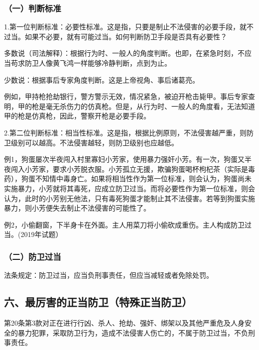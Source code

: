 \subsubsection*{（一）判断标准}

1.第一位判断标准：必要性标准。这是指，只要是制止不法侵害的必要手段，就不过当。如果不必要，就有可能过当。如何判断防卫手段是否具有必要性？

多数说（司法解释）：根据行为时、一般人的角度判断。也即，在紧急时刻，不应当苟求防卫人像黄飞鸿一样能够冷静判断，点到为止。

少数说：根据事后专家角度判断。这是上帝视角、事后诸葛亮。

例如，甲持枪抢劫银行，警方警示无效，情况紧急，被迫开枪击毙甲。事后专家查明，甲的枪是毫无杀伤力的仿真枪。但是，从行为时、一般人的角度看，无法知道甲的枪是仿真枪，因此，警察开枪是必要手段。

2.第二位判断标准：相当性标准。这是指，根据比例原则，不法侵害越严重，则防卫级别可以越高。不法侵害越轻，则防卫级别也应越低。

例1，狗蛋屡次半夜闯入村里寡妇小芳家，使用暴力强奸小芳。有一次，狗蛋又半夜闯入小芳家，要求小芳脱衣服。小芳孤立无援，欺骗狗蛋喝杯枸杞茶（实际是毒药），狗蛋不知情中毒身亡。如果将相当性作为第一位标准，则会认为，狗蛋尚未实施暴力，小芳就将其毒死，应成立防卫过当。而将必要性作为第一位标准，则会认为，此时的小芳别无他法，只有毒死狗蛋才能制止其不法侵害。若等到狗蛋实施暴力，则小芳便失去制止不法侵害的可能性了。

例2，小偷翻窗，下半身卡在外面。主人用菜刀将小偷砍成重伤。主人构成防卫过当。(2019年试题）

\subsubsection*{（二）防卫过当}

法条规定：防卫过当，应当负刑事责任，但应当减轻或者免除处罚。


\subsection*{六、最厉害的正当防卫（特殊正当防卫）}

第20条第3款对正在进行行凶、杀人、抢劫、强奸、绑架以及其他严重危及人身安全的暴力犯罪，采取防卫行为，造成不法侵害人伤亡的，不属于防卫过当，不负刑事责任。

